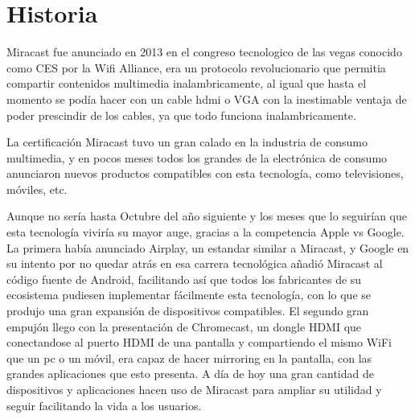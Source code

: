\section{Historia}

Miracast fue anunciado en 2013 en el congreso tecnologico de las vegas conocido como CES por la Wifi Alliance, era un protocolo revolucionario que permitia compartir contenidos multimedia inalambricamente, al igual que hasta el momento se podía hacer con un cable hdmi o VGA con la inestimable ventaja de poder prescindir de los cables, ya que todo funciona inalambricamente.

La certificación Miracast tuvo un gran calado en la industria de consumo multimedia, y en pocos meses todos los grandes de la electrónica de consumo anunciaron nuevos productos compatibles con esta tecnología, como televisiones, móviles, etc.

Aunque no sería hasta Octubre del año siguiente y los meses que lo seguirían que esta tecnología viviría su mayor auge, gracias a la competencia Apple vs Google. La primera había anunciado Airplay, un estandar similar a Miracast, y Google en su intento por no quedar atrás en esa carrera tecnológica añadió Miracast al código fuente de Android, facilitando así que todos los fabricantes de su ecosistema pudiesen implementar fácilmente esta tecnología, con lo que se produjo una gran expansión de dispositivos compatibles.
El segundo gran empujón llego con la presentación de Chromecast, un dongle HDMI que conectandose al puerto HDMI de una pantalla y compartiendo el mismo WiFi que un pc o un móvil, era capaz de hacer mirroring en la pantalla, con las grandes aplicaciones que esto presenta.
A día de hoy una gran cantidad de dispositivos y aplicaciones hacen uso de Miracast para ampliar su utilidad y seguir facilitando la vida a los usuarios.
